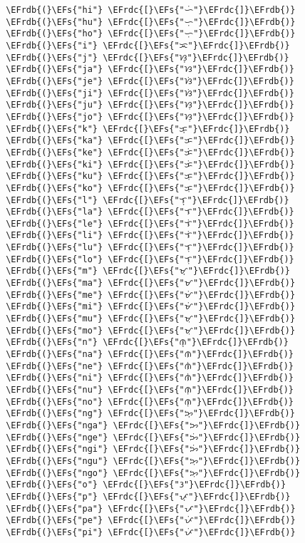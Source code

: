 \documentclass[a4wide,10pt]{article}
\newcommand{\EFs}[1]{\textcolor{EFs}{#1}} %
\newcommand{\EFrdb}[1]{\textcolor{EFrdb}{#1}} %
\newcommand{\EFrdc}[1]{\textcolor{EFrdc}{#1}} %
\begin{document}
\begin{Code}
\begin{Verbatim}
 \EFrdb{(}\EFs{"hi"} \EFrdc{[}\EFs{"ᜑᜒ"}\EFrdc{]}\EFrdb{)}
 \EFrdb{(}\EFs{"hu"} \EFrdc{[}\EFs{"ᜑᜓ"}\EFrdc{]}\EFrdb{)}
 \EFrdb{(}\EFs{"ho"} \EFrdc{[}\EFs{"ᜑᜓ"}\EFrdc{]}\EFrdb{)}
 \EFrdb{(}\EFs{"i"} \EFrdc{[}\EFs{"ᜁ"}\EFrdc{]}\EFrdb{)}
 \EFrdb{(}\EFs{"j"} \EFrdc{[}\EFs{"ᜐ᜔"}\EFrdc{]}\EFrdb{)}
 \EFrdb{(}\EFs{"ja"} \EFrdc{[}\EFs{"ᜐ"}\EFrdc{]}\EFrdb{)}
 \EFrdb{(}\EFs{"je"} \EFrdc{[}\EFs{"ᜐᜒ"}\EFrdc{]}\EFrdb{)}
 \EFrdb{(}\EFs{"ji"} \EFrdc{[}\EFs{"ᜐᜒ"}\EFrdc{]}\EFrdb{)}
 \EFrdb{(}\EFs{"ju"} \EFrdc{[}\EFs{"ᜐᜓ"}\EFrdc{]}\EFrdb{)}
 \EFrdb{(}\EFs{"jo"} \EFrdc{[}\EFs{"ᜐᜓ"}\EFrdc{]}\EFrdb{)}
 \EFrdb{(}\EFs{"k"} \EFrdc{[}\EFs{"ᜃ᜔"}\EFrdc{]}\EFrdb{)}
 \EFrdb{(}\EFs{"ka"} \EFrdc{[}\EFs{"ᜃ"}\EFrdc{]}\EFrdb{)}
 \EFrdb{(}\EFs{"ke"} \EFrdc{[}\EFs{"ᜃᜒ"}\EFrdc{]}\EFrdb{)}
 \EFrdb{(}\EFs{"ki"} \EFrdc{[}\EFs{"ᜃᜒ"}\EFrdc{]}\EFrdb{)}
 \EFrdb{(}\EFs{"ku"} \EFrdc{[}\EFs{"ᜃᜓ"}\EFrdc{]}\EFrdb{)}
 \EFrdb{(}\EFs{"ko"} \EFrdc{[}\EFs{"ᜃᜓ"}\EFrdc{]}\EFrdb{)}
 \EFrdb{(}\EFs{"l"} \EFrdc{[}\EFs{"ᜎ᜔"}\EFrdc{]}\EFrdb{)}
 \EFrdb{(}\EFs{"la"} \EFrdc{[}\EFs{"ᜎ"}\EFrdc{]}\EFrdb{)}
 \EFrdb{(}\EFs{"le"} \EFrdc{[}\EFs{"ᜎᜒ"}\EFrdc{]}\EFrdb{)}
 \EFrdb{(}\EFs{"li"} \EFrdc{[}\EFs{"ᜎᜒ"}\EFrdc{]}\EFrdb{)}
 \EFrdb{(}\EFs{"lu"} \EFrdc{[}\EFs{"ᜎᜓ"}\EFrdc{]}\EFrdb{)}
 \EFrdb{(}\EFs{"lo"} \EFrdc{[}\EFs{"ᜎᜓ"}\EFrdc{]}\EFrdb{)}
 \EFrdb{(}\EFs{"m"} \EFrdc{[}\EFs{"ᜋ᜔"}\EFrdc{]}\EFrdb{)}
 \EFrdb{(}\EFs{"ma"} \EFrdc{[}\EFs{"ᜋ"}\EFrdc{]}\EFrdb{)}
 \EFrdb{(}\EFs{"me"} \EFrdc{[}\EFs{"ᜋᜒ"}\EFrdc{]}\EFrdb{)}
 \EFrdb{(}\EFs{"mi"} \EFrdc{[}\EFs{"ᜋᜒ"}\EFrdc{]}\EFrdb{)}
 \EFrdb{(}\EFs{"mu"} \EFrdc{[}\EFs{"ᜋᜓ"}\EFrdc{]}\EFrdb{)}
 \EFrdb{(}\EFs{"mo"} \EFrdc{[}\EFs{"ᜋᜓ"}\EFrdc{]}\EFrdb{)}
 \EFrdb{(}\EFs{"n"} \EFrdc{[}\EFs{"ᜈ᜔"}\EFrdc{]}\EFrdb{)}
 \EFrdb{(}\EFs{"na"} \EFrdc{[}\EFs{"ᜈ"}\EFrdc{]}\EFrdb{)}
 \EFrdb{(}\EFs{"ne"} \EFrdc{[}\EFs{"ᜈᜒ"}\EFrdc{]}\EFrdb{)}
 \EFrdb{(}\EFs{"ni"} \EFrdc{[}\EFs{"ᜈᜒ"}\EFrdc{]}\EFrdb{)}
 \EFrdb{(}\EFs{"nu"} \EFrdc{[}\EFs{"ᜈᜓ"}\EFrdc{]}\EFrdb{)}
 \EFrdb{(}\EFs{"no"} \EFrdc{[}\EFs{"ᜈᜓ"}\EFrdc{]}\EFrdb{)}
 \EFrdb{(}\EFs{"ng"} \EFrdc{[}\EFs{"ᜅ᜔"}\EFrdc{]}\EFrdb{)}
 \EFrdb{(}\EFs{"nga"} \EFrdc{[}\EFs{"ᜅ"}\EFrdc{]}\EFrdb{)}
 \EFrdb{(}\EFs{"nge"} \EFrdc{[}\EFs{"ᜅᜒ"}\EFrdc{]}\EFrdb{)}
 \EFrdb{(}\EFs{"ngi"} \EFrdc{[}\EFs{"ᜅᜒ"}\EFrdc{]}\EFrdb{)}
 \EFrdb{(}\EFs{"ngu"} \EFrdc{[}\EFs{"ᜅᜓ"}\EFrdc{]}\EFrdb{)}
 \EFrdb{(}\EFs{"ngo"} \EFrdc{[}\EFs{"ᜅᜓ"}\EFrdc{]}\EFrdb{)}
 \EFrdb{(}\EFs{"o"} \EFrdc{[}\EFs{"ᜂ"}\EFrdc{]}\EFrdb{)}
 \EFrdb{(}\EFs{"p"} \EFrdc{[}\EFs{"ᜉ᜔"}\EFrdc{]}\EFrdb{)}
 \EFrdb{(}\EFs{"pa"} \EFrdc{[}\EFs{"ᜉ"}\EFrdc{]}\EFrdb{)}
 \EFrdb{(}\EFs{"pe"} \EFrdc{[}\EFs{"ᜉᜒ"}\EFrdc{]}\EFrdb{)}
 \EFrdb{(}\EFs{"pi"} \EFrdc{[}\EFs{"ᜉᜒ"}\EFrdc{]}\EFrdb{)}

\end{Verbatim}
\end{Code}
\end{document}

